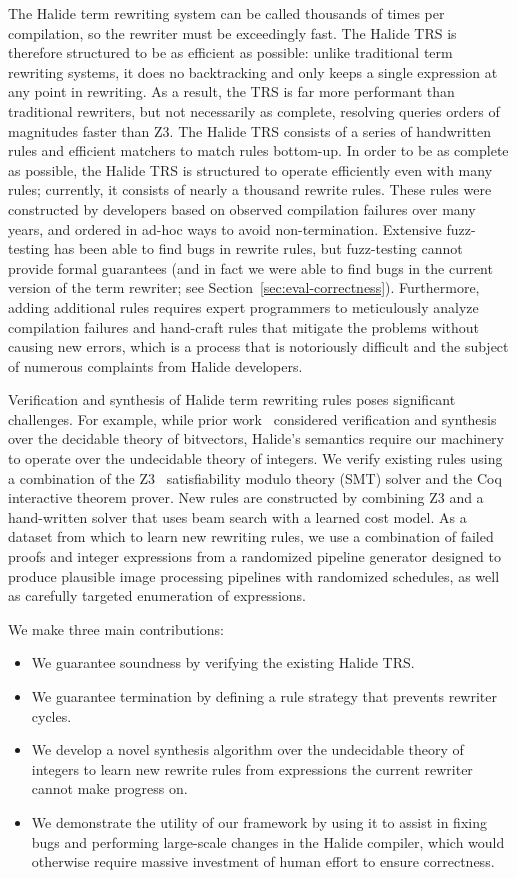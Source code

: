 \documentclass[acmsmall,review,anonymous]{acmart}\settopmatter{printfolios=true,printccs=false,printacmref=false}
\begin{document}
The Halide term rewriting system can be called thousands of times per
compilation, so the rewriter must be exceedingly fast.  The Halide
TRS is therefore structured to be as efficient as possible: unlike traditional
term rewriting systems, it does no backtracking and only keeps a single expression
at any point in rewriting.  As a result, the TRS is far more performant than traditional
rewriters, but not necessarily as complete, resolving queries orders of magnitudes faster than Z3.
The Halide TRS consists of a series of handwritten rules and efficient matchers
to match rules bottom-up. In order to be as complete as possible, the Halide TRS is structured
to operate efficiently even with many rules; currently, it consists of nearly a thousand
rewrite rules.  These rules were constructed by developers based on
observed compilation failures over many years, and ordered in ad-hoc ways to
avoid non-termination. Extensive fuzz-testing has been able to find bugs in
rewrite rules, but fuzz-testing cannot provide formal guarantees (and in fact we
were able to find bugs in the current version of the term rewriter;
see Section~\ref{sec:eval-correctness}). Furthermore, adding additional rules requires
expert programmers to meticulously analyze compilation failures and hand-craft
rules that mitigate the problems without causing new errors, which is a process
that is notoriously difficult and the subject of numerous complaints from
Halide developers.

Verification and synthesis of Halide term rewriting rules poses significant
challenges. For example, while prior work~\cite{lopes2015alive,menendez2017aliveinfer}
considered verification and synthesis over the decidable theory of bitvectors,
Halide's semantics require our machinery to operate over the undecidable theory
of integers.
We verify existing rules using a combination of the Z3~\cite{de2008z3}
satisfiability modulo theory (SMT) solver and the Coq~\cite{coq19} interactive
theorem prover. New rules are constructed by combining Z3 and a hand-written
solver that uses beam search with a learned cost model. As a dataset from which
to learn new rewriting rules, we use a combination of failed proofs and integer
expressions from a randomized pipeline generator designed to produce plausible
image processing pipelines with randomized schedules, as well as carefully
targeted enumeration of expressions.

We make three main contributions:
\begin{itemize}
  \item We guarantee soundness by verifying the existing Halide TRS.
  \item We guarantee termination by defining a rule strategy that prevents rewriter cycles.
  \item We develop a novel synthesis algorithm over the undecidable theory of integers to learn new rewrite rules from
    expressions the current rewriter cannot make progress on.
  \item We demonstrate the utility of our framework by using it to assist in
    fixing bugs and performing large-scale changes in the Halide compiler, which would otherwise require massive
    investment of human effort to ensure correctness.
\end{itemize}
\end{document}

